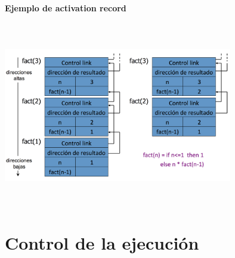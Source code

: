 \documentclass[10pt,a4paper]{report}
\begin{document}
\subsubsection{Ejemplo de activation record}

\begin{center}  
        \includegraphics[width=10cm, height=8cm]{factorial.png}
\end{center}


\chapter{Control de la ejecución}
\end{document}
